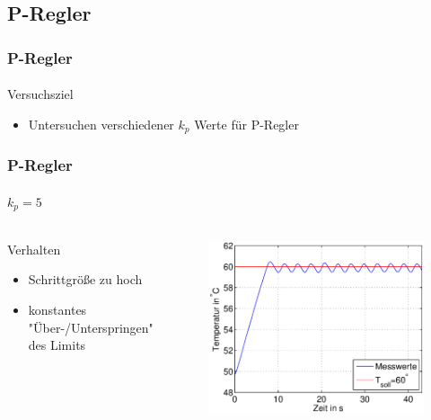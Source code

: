 \subsection{P-Regler} %
\label{sub:P-Regler}
\begin{frame}
    \frametitle{P-Regler}
    \framesubtitle{}
    \begin{block}{Versuchsziel}
         \begin{itemize}
             \item Untersuchen verschiedener $k_p$ Werte für P-Regler
         \end{itemize}
    \end{block}
\end{frame}
\begin{frame}
    \frametitle{P-Regler}
    \framesubtitle{$k_p=5$}
    \begin{columns}[c]
            \begin{block}{Verhalten}
                 \begin{itemize}
                     \item Schrittgröße zu hoch
                     \item konstantes "Über-/Unterspringen" des Limits
                 \end{itemize}
            \end{block}
        \begin{figure}[H]
        \begin{center}
                \includegraphics[scale=0.4]{./img/plots/Auf_2_b_5.eps}
        \end{center}
        \end{figure}
     \end{columns}
\end{frame}
